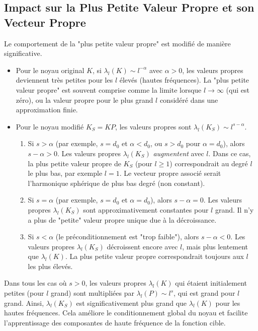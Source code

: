 \documentclass{article}
\begin{document}
\subsection{Impact sur la Plus Petite Valeur Propre et son Vecteur Propre}
Le comportement de la "plus petite valeur propre" est modifié de manière significative.
\begin{itemize}
    \item Pour le noyau original $K$, si $\lambda_l(K) \sim l^{-\alpha}$ avec $\alpha > 0$, les valeurs propres deviennent très petites pour les $l$ élevés (hautes fréquences). La "plus petite valeur propre" est souvent comprise comme la limite lorsque $l \to \infty$ (qui est zéro), ou la valeur propre pour le plus grand $l$ considéré dans une approximation finie.

    \item Pour le noyau modifié $K_S = KP$, les valeurs propres sont $\lambda_l(K_S) \sim l^{s-\alpha}$.
    \begin{enumerate}
        \item Si $s > \alpha$ (par exemple, $s=d_0$ et $\alpha < d_0$, ou $s > d_0$ pour $\alpha=d_0$), alors $s-\alpha > 0$. Les valeurs propres $\lambda_l(K_S)$ \textit{augmentent} avec $l$. Dans ce cas, la plus petite valeur propre de $K_S$ (pour $l \ge 1$) correspondrait au degré $l$ le plus bas, par exemple $l=1$. Le vecteur propre associé serait l'harmonique sphérique de plus bas degré (non constant).
        \item Si $s = \alpha$ (par exemple, $s=d_0$ et $\alpha=d_0$), alors $s-\alpha = 0$. Les valeurs propres $\lambda_l(K_S)$ sont approximativement constantes pour $l$ grand. Il n'y a plus de "petite" valeur propre unique due à la décroissance.
        \item Si $s < \alpha$ (le préconditionnement est "trop faible"), alors $s-\alpha < 0$. Les valeurs propres $\lambda_l(K_S)$ décroissent encore avec $l$, mais plus lentement que $\lambda_l(K)$. La plus petite valeur propre correspondrait toujours aux $l$ les plus élevés.
    \end{enumerate}
\end{itemize}
Dans tous les cas où $s>0$, les valeurs propres $\lambda_l(K)$ qui étaient initialement petites (pour $l$ grand) sont multipliées par $\lambda_l(P) \sim l^s$, qui est grand pour $l$ grand. Ainsi, $\lambda_l(K_S)$ est significativement plus grand que $\lambda_l(K)$ pour les hautes fréquences. Cela améliore le conditionnement global du noyau et facilite l'apprentissage des composantes de haute fréquence de la fonction cible.
\end{document}

